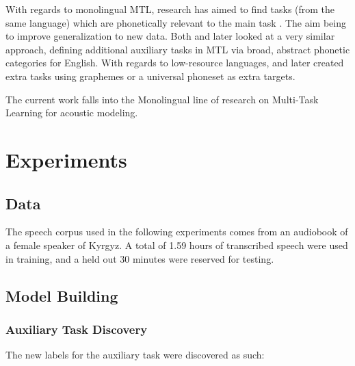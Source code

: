\documentclass[a4paper]{article}
\begin{document}
With regards to monolingual MTL, research has aimed to find tasks (from the same language) which are phonetically relevant to the main task \cite{bell2015}. The aim being to improve generalization to new data. Both \cite{seltzer2013} and later \cite{huang2015} looked at a very similar approach, defining additional auxiliary tasks in MTL via broad, abstract phonetic categories for English. With regards to low-resource languages, \cite{chen2014} and later \cite{chen2015} created extra tasks using graphemes or a universal phoneset as extra targets.

The current work falls into the Monolingual line of research on Multi-Task Learning for acoustic modeling.


\section{Experiments}


\subsection{Data}

The speech corpus used in the following experiments comes from an audiobook of a female speaker of Kyrgyz. A total of 1.59 hours of transcribed speech were used in training, and a held out 30 minutes were reserved for testing.


\subsection{Model Building}


\subsubsection{Auxiliary Task Discovery}

The new labels for the auxiliary task were discovered as such:
\end{document}

